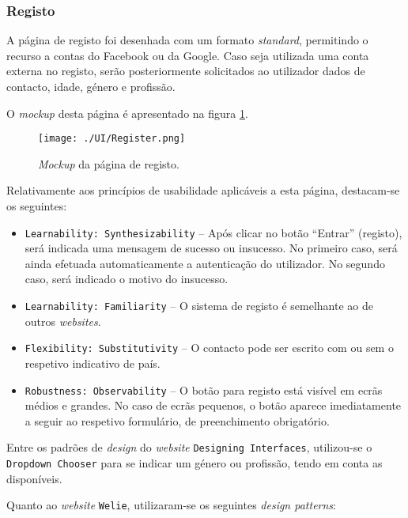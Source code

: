 \subsubsection{Registo}

A página de registo foi desenhada com um formato \textit{standard}, permitindo o recurso a contas do Facebook ou da Google. Caso seja utilizada uma conta externa no registo, serão posteriormente solicitados ao utilizador dados de contacto, idade, género e profissão.

O \textit{mockup} desta página é apresentado na figura \ref{fig:register}.

\begin{figure}[H]
    \centering
    \texttt{[image: ./UI/Register.png]}
    \caption{\textit{Mockup} da página de registo.}
    \label{fig:register}
\end{figure}

Relativamente aos princípios de usabilidade aplicáveis a esta página, destacam-se os seguintes:

\begin{itemize}
    \item \texttt{Learnability: Synthesizability} -- Após clicar no botão ``Entrar'' (registo), será indicada uma mensagem de sucesso ou insucesso. No primeiro caso, será ainda efetuada automaticamente a autenticação do utilizador. No segundo caso, será indicado o motivo do insucesso.
    
    \item \texttt{Learnability: Familiarity} -- O sistema de registo é semelhante ao de outros \textit{websites}.
    
    \item \texttt{Flexibility: Substitutivity} -- O contacto pode ser escrito com ou sem o respetivo indicativo de país.
    
    \item \texttt{Robustness: Observability} -- O botão para registo está visível em ecrãs médios e grandes. No caso de ecrãs pequenos, o botão aparece imediatamente a seguir ao respetivo formulário, de preenchimento obrigatório.
\end{itemize}


Entre os padrões de \textit{design} do \textit{website} \texttt{Designing Interfaces}, utilizou-se o \texttt{Dropdown Chooser} para se indicar um género ou profissão, tendo em conta as disponíveis. 

Quanto ao \textit{website} \texttt{Welie}, utilizaram-se os seguintes \textit{design patterns}:

